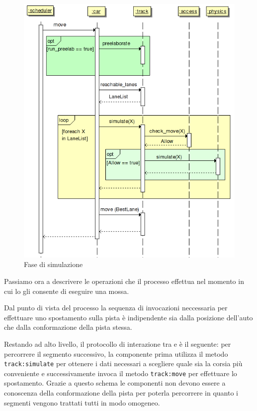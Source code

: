 \begin{figure}
\includegraphics[width=\textwidth]{diagrammi/Simulation}
\caption{Fase di simulazione}
\label{fig:simulation}
\end{figure}

Passiamo ora a descrivere le operazioni che il processo \car{} effettua nel momento in cui lo \sched{} gli consente di eseguire una mossa.

Dal punto di vista del processo \car{} la sequenza di invocazioni neccessaria per effettuare uno spostamento sulla pista è indipendente sia dalla posizione dell'auto che dalla conformazione della pista stessa.

Restando ad alto livello, il protocollo di interazione tra \car{} e \track{} è il seguente: per percorrere il segmento successivo, la componente \car{} prima utilizza il metodo \texttt{track:simulate} per ottenere i dati necessari a scegliere quale sia la corsia più conveniente e successivamente invoca il metodo \texttt{track:move} per effettuare lo spostamento.
Grazie a questo schema le componenti \car{} non devono essere a conoscenza della conformazione della pista per poterla percorrere in quanto i segmenti vengono trattati tutti in modo omogeneo.

